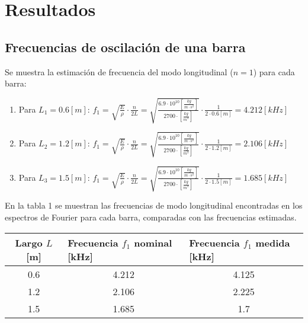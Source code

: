 \documentclass[letterpaper,11pt]{article} %
\begin{document}
\newpage \section{Resultados}
\subsection{Frecuencias de oscilación de una barra}

Se muestra la estimación de frecuencia del modo longitudinal ($n=1$) para cada barra:
\begin{enumerate}
    \item Para $L_1=0.6 [m]$:
$f_1=\sqrt{\frac{E}{\rho }}\cdot \frac{n}{2L}=\sqrt{\frac{6.9\cdot 10^{10}[\frac{kg}{m\cdot s^2}]}{2700\cdot [\frac{kg}{m^3}]}}\cdot \frac{1}{2\cdot 0.6 [m]}=4.212 [kHz]$ 
    \item Para $L_2=1.2[m]$:
$f_1=\sqrt{\frac{E}{\rho }}\cdot \frac{n}{2L}=\sqrt{\frac{6.9\cdot 10^{10}[\frac{kg}{m\cdot s^2}]}{2700\cdot [\frac{kg}{m^3}]}}\cdot \frac{1}{2\cdot 1.2 [m]}=2.106 [kHz]$
    \item 
Para $L_3=1.5 [m]$:
$f_1=\sqrt{\frac{E}{\rho }}\cdot \frac{n}{2L}=\sqrt{\frac{6.9\cdot 10^{10}[\frac{kg}{m\cdot s^2}]}{2700\cdot [\frac{kg}{m^3}]}}\cdot \frac{1}{2\cdot 1.5 [m]}=1.685 [kHz]$
    
\end{enumerate}

En la tabla 1 se muestran las frecuencias de modo longitudinal encontradas en los espectros de Fourier para cada barra, comparadas con las frecuencias estimadas. 
\begin{center}
    

\begin{tabular}{|c|c|c|}
\hline
\textbf{Largo $L$ {[}m{]}} & \multicolumn{1}{l|}{\textbf{Frecuencia $f_1$ nominal {[}kHz{]}}} & \multicolumn{1}{l|}{\textbf{Frecuencia $f_1$ medida {[}kHz{]}}} \\ \hline
0.6                        & 4.212                                                            & 4.125                                                           \\ \hline
1.2                        & 2.106                                                            & 2.225                                                           \\ \hline
1.5                        & 1.685                                                            & 1.7                                                             \\ \hline
\end{tabular}
\end{center}
\end{document}
